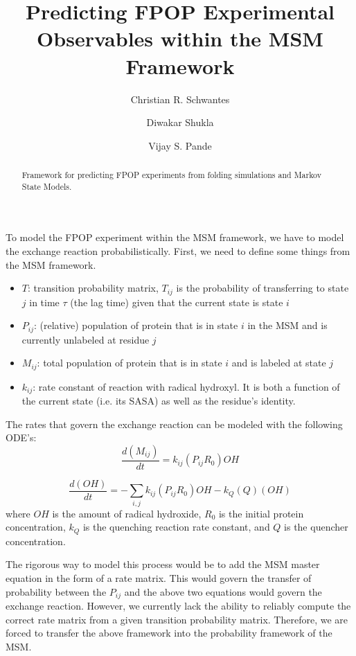 \documentclass[twocolumn,floatfix,nofootinbib,aps]{revtex4-1}
\begin{document}
\title{Predicting FPOP Experimental Observables within the MSM Framework}
\author{Christian R. Schwantes}
\author{Diwakar Shukla}
\author{Vijay S. Pande}

\begin{abstract}
Framework for predicting FPOP experiments from folding simulations and Markov State Models.\end{abstract}

\maketitle

To model the FPOP experiment within the MSM framework, we have to model the exchange reaction probabilistically. First, we need to define some things from the MSM framework.

\begin{itemize}
\item $T$: transition probability matrix, $T_{ij}$ is the probability of transferring to state $j$ in time $\tau$ (the lag time) given that the current state is state $i$
\item $P_{ij}$: (relative) population of protein that is in state $i$ in the MSM and is currently unlabeled at residue $j$
\item $M_{ij}$: total population of protein that is in state $i$ and is labeled at state $j$
\item $k_{ij}$: rate constant of reaction with radical hydroxyl. It is both a function of the current state (i.e. its SASA) as well as the residue's identity.
\end{itemize}

The rates that govern the exchange reaction can be modeled with the following ODE's:
\begin{equation}
\frac{d(M_{ij})}{dt} = k_{ij} (P_{ij} R_0) OH
\end{equation}

\begin{equation}
\frac{d(OH)}{dt} = - \sum_{i, j} k_{ij} (P_{ij} R_0) OH - k_Q (Q) (OH)
\end{equation} where $OH$ is the amount of radical hydroxide, $R_0$ is the initial protein concentration, $k_Q$ is the quenching reaction rate constant, and $Q$ is the quencher concentration.

The rigorous way to model this process would be to add the MSM master equation in the form of a rate matrix. This would govern the transfer of probability between the $P_{ij}$ and the above two equations would govern the exchange reaction. However, we currently lack the ability to reliably compute the correct rate matrix from a given transition probability matrix. Therefore, we are forced to transfer the above framework into the probability framework of the MSM.
\end{document}
